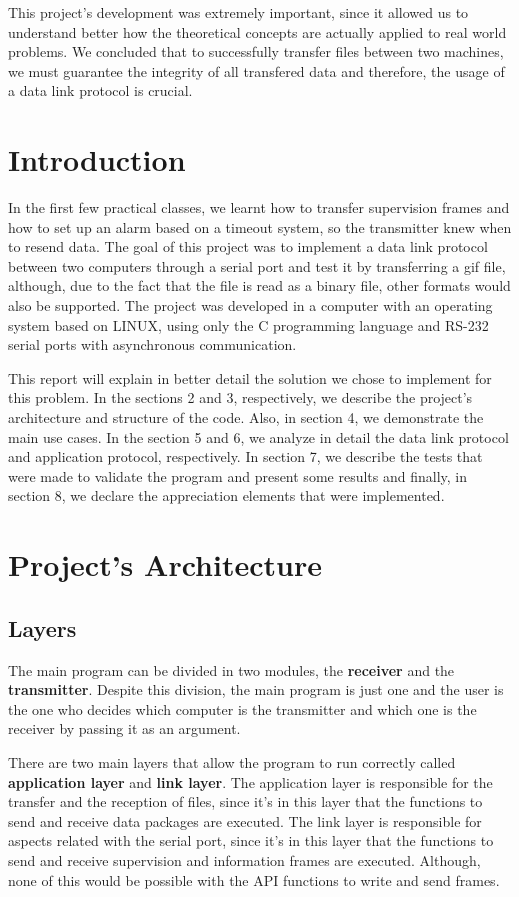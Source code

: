 \documentclass[a4paper]{article}
\begin{document}
This project's development was extremely important, since it allowed us to understand better how the theoretical concepts are actually applied to real world problems. We concluded that to successfully transfer files between two machines, we must guarantee the integrity of all transfered data and therefore, the usage of a data link protocol is crucial.


\section{Introduction}

In the first few practical classes, we learnt how to transfer supervision frames and how to set up an alarm based on a timeout system, so the transmitter knew when to resend data. The goal of this project was to implement a data link protocol between two computers through a serial port and test it by transferring a gif file, although, due to the fact that the file is read as a binary file, other formats would also be supported. The project was developed in a computer with an operating system based on LINUX, using only the C programming language and RS-232 serial ports with asynchronous communication.

This report will explain in better detail the solution we chose to implement for this problem. In the sections 2 and 3, respectively, we describe the project's architecture and structure of the code. Also, in section 4, we demonstrate the main use cases. In the section 5 and 6, we analyze in detail the data link protocol and application protocol, respectively. In section 7, we describe the tests that were made to validate the program and present some results and finally, in section 8, we declare the appreciation elements that were implemented.

\section{Project's Architecture}

\subsection{Layers}
The main program can be divided in two modules, the \textbf{receiver} and the \textbf{transmitter}. Despite this division, the main program is just one and the user is the one who decides which computer is the transmitter and which one is the receiver by passing it as an argument. 

There are two main layers that allow the program to run correctly called \textbf{application layer} and \textbf{link layer}. The application layer is responsible for the transfer and the reception of files, since it's in this layer that the functions to send and receive data packages are executed. The link layer is responsible for aspects related with the serial port, since it's in this layer that the functions to send and receive supervision and information frames are executed. Although, none of this would be possible with the API functions to write and send frames.
\end{document}
